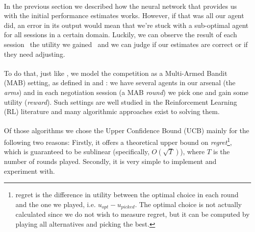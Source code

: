 \paragraph*{}
In the previous section we described how the neural network that provides us with the initial performance estimates works. However, if that was all our agent did, an error in its output would mean that we're stuck with a sub-optimal agent for all sessions in a certain domain. %
Luckily, we can observe the result of each session \textendash \ the utility we gained  \textendash \ and we can judge if our estimates are correct or if they need adjusting.

\paragraph*{}
To do that, just like \cite{meta_agent_paper}, we model the competition as a Multi-Armed Bandit (MAB) setting, as defined in \cite{MAB_Lai_Robbins_1985} and \cite{MAB_paper_2002}: we have several agents in our arsenal (the \emph{arms}) and in each negotiation session (a MAB \emph{round}) we pick one and gain some utility (\emph{reward}). Such settings are well studied in the Reinforcement Learning (RL) literature and many algorithmic approaches exist to solving them. %

\paragraph*{}
Of those algorithms we chose the Upper Confidence Bound (UCB) \cite{UCB_paper} mainly for the following two reasons: Firstly, it offers a theoretical upper bound  on \emph{regret}\footnote{regret is the difference in utility between the optimal choice in each round and the one we played, i.e. $u_{opt} - u_{picked}$. The optimal choice is not actually calculated since we do not wish to measure regret, but it can be computed by playing all alternatives and picking the best.}, which is guaranteed to be sublinear (specifically, $O(\sqrt{T})$), where $T$ is the number of rounds played. Secondly, it is very simple to implement and experiment with. %

